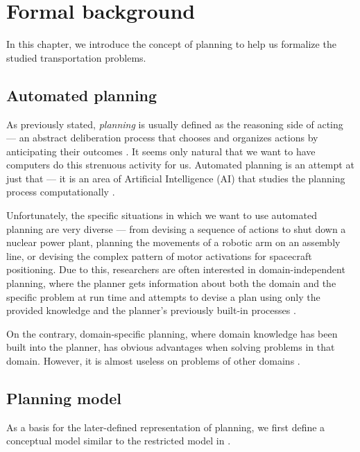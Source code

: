 \chapter{Formal background}

In this chapter, we introduce the concept of planning to help us formalize the studied transportation problems.

\section{Automated planning}

As previously stated, \textit{planning} is usually defined as the reasoning side of acting --- an abstract deliberation
process that chooses and organizes actions by anticipating their outcomes
\citep[Section~1.1]{Ghallab2004}.
It seems only natural that we want to have computers do this strenuous activity for us.
Automated planning is an attempt at just that --- it is an area of Artificial Intelligence (AI) that
studies the planning process computationally \citep[Section~1.1]{Ghallab2004}.

Unfortunately, the specific situations in which we want to use automated planning are very diverse
--- from devising a sequence of actions to shut down a nuclear power plant,
planning the movements of a robotic arm
on an assembly line, or devising the complex pattern of motor activations
for spacecraft positioning.
Due to this, researchers are often interested in domain-independent planning,
where the planner gets information
about both the domain and the specific problem at run time and attempts to devise a plan using only the provided knowledge
and the planner's previously built-in processes \citep[Section~1.3]{Ghallab2004}.

On the contrary, domain-specific planning, where domain knowledge has been built into the planner,
has obvious advantages when solving problems in that domain. However,
it is almost useless on problems of other
domains \citep[Section~1.3]{Ghallab2004}.

\section{Planning model}

As a basis for the later-defined representation of planning, we first define
a conceptual model similar to the restricted model in \citep[Section~1.4, Section~1.5]{Ghallab2004}.

